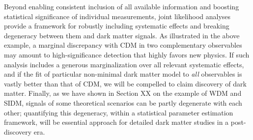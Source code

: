 \documentclass[modern,linenumbers]{aastex62}
\begin{document}
Beyond enabling consistent inclusion of all available information and boosting statistical significance of individual measurements, joint likelihood analyses provide a framework for robustly including systematic effects and breaking degeneracy between them and dark matter signals. 
As illustrated in the above example, a marginal discrepancy with CDM in two complementary observables may amount to high-significance detection that highly favors new physics. 
If such analysis includes a generous marginalization over all relevant systematic effects, and if the fit of particular non-minimal dark matter model to \textit{all} observables is vastly better than that of CDM, we will be compelled to claim discovery of dark matter. 
Finally, as we have shown in Section XX on the example of WDM and SIDM, signals of some theoretical scenarios can be partly degenerate with each other; quantifying this degeneracy, within a statistical parameter estimation framework, will be essential approach for detailed dark matter studies in a post-discovery era.



\end{document}
